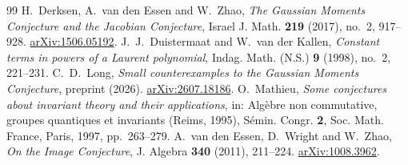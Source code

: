 \documentclass[10pt,a4paper]{amsart}
\numberwithin{equation}{section}
\begin{document}
\begin{thebibliography}{99}
 H.~Derksen, A.~van den Essen and W.~Zhao, \emph{The Gaussian Moments Conjecture and the Jacobian Conjecture}, Israel J. Math. \textbf{219} (2017), no.~2, 917--928. \href{https://arxiv.org/abs/1506.05192}{arXiv:1506.05192}.
 J.~J.~Duistermaat and W.~van der Kallen, \emph{Constant terms in powers of a Laurent polynomial}, Indag. Math. (N.S.) \textbf{9} (1998), no.~2, 221--231.
 C.~D.~Long, \emph{Small counterexamples to the Gaussian Moments Conjecture}, preprint (2026). \href{https://arxiv.org/abs/2607.18186}{arXiv:2607.18186}.
 O.~Mathieu, \emph{Some conjectures about invariant theory and their applications}, in: Alg\`ebre non commutative, groupes quantiques et invariants (Reims, 1995), S\'emin. Congr. \textbf{2}, Soc. Math. France, Paris, 1997, pp.~263--279.
 A.~van den Essen, D.~Wright and W.~Zhao, \emph{On the Image Conjecture}, J. Algebra \textbf{340} (2011), 211--224. \href{https://arxiv.org/abs/1008.3962}{arXiv:1008.3962}.
\end{thebibliography}
\end{document}
